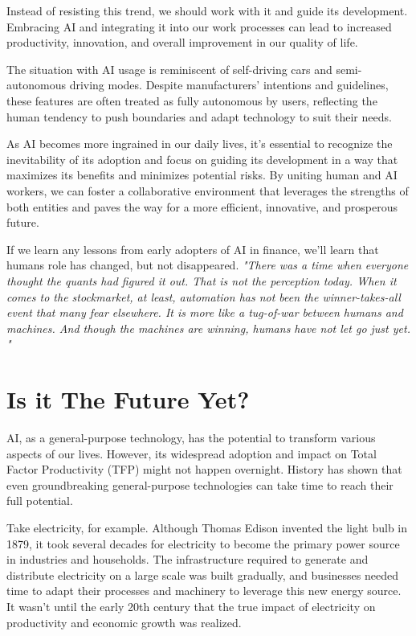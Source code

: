 Instead of resisting this trend, we should work with it and guide its development. Embracing AI and integrating it into our work processes can lead to increased productivity, innovation, and overall improvement in our quality of life.

The situation with AI usage is reminiscent of self-driving cars and semi-autonomous driving modes. Despite manufacturers' intentions and guidelines, these features are often treated as fully autonomous by users, reflecting the human tendency to push boundaries and adapt technology to suit their needs.

As AI becomes more ingrained in our daily lives, it's essential to recognize the inevitability of its adoption and focus on guiding its development in a way that maximizes its benefits and minimizes potential risks. By uniting human and AI workers, we can foster a collaborative environment that leverages the strengths of both entities and paves the way for a more efficient, innovative, and prosperous future. 

If we learn any lessons from early adopters of AI in finance, we'll learn that humans role has changed, but not disappeared. \textit{"There was a time when everyone thought the quants had figured it out. That is not the perception today. When it comes to the stockmarket, at least, automation has not been the winner-takes-all event that many fear elsewhere. It is more like a tug-of-war between humans and machines. And though the machines are winning, humans have not let go just yet. "} 

\section{Is it The Future Yet?}

AI, as a general-purpose technology, has the potential to transform various aspects of our lives. However, its widespread adoption and impact on Total Factor Productivity (TFP) might not happen overnight. History has shown that even groundbreaking general-purpose technologies can take time to reach their full potential.

Take electricity, for example. Although Thomas Edison invented the light bulb in 1879, it took several decades for electricity to become the primary power source in industries and households. The infrastructure required to generate and distribute electricity on a large scale was built gradually, and businesses needed time to adapt their processes and machinery to leverage this new energy source. It wasn't until the early 20th century that the true impact of electricity on productivity and economic growth was realized.

